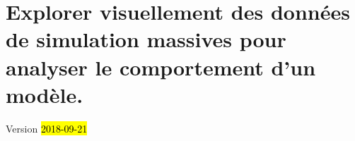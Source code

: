 \chapter{Explorer visuellement des données de simulation massives pour analyser le comportement d'un modèle.}
\begin{center}
	{\large Version \hl{2018-09-21}}

\end{center}
\minitoc

\clearpage

%
%
%
%
%
%
